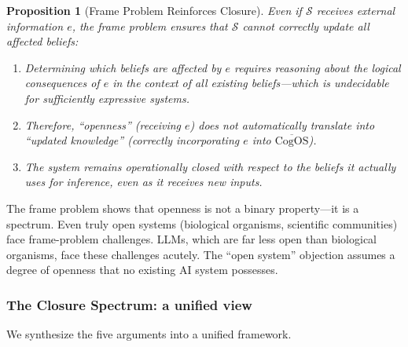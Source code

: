 \documentclass[11pt]{article}
\newtheorem{proposition}{Proposition}
\newcommand{\CogOS}{\text{CogOS}}
\begin{document}
\begin{proposition}[Frame Problem Reinforces Closure]
\label{prop:frame}
Even if $\mathcal{S}$ receives external information $e$, the frame problem
ensures that $\mathcal{S}$ cannot correctly update \textit{all} affected
beliefs:
\begin{enumerate}
\item[(a)] Determining which beliefs are affected by $e$ requires reasoning
      about the logical consequences of $e$ in the context of all existing
      beliefs---which is undecidable for sufficiently expressive systems.
\item[(b)] Therefore, ``openness'' (receiving $e$) does not automatically
      translate into ``updated knowledge'' (correctly incorporating $e$ into
      $\overline{\CogOS}$).
\item[(c)] The system remains operationally closed with respect to the beliefs
      it \textit{actually uses} for inference, even as it receives new inputs.
\end{enumerate}
\end{proposition}

\noindent The frame problem shows that openness is not a binary
property---it is a spectrum. Even truly open systems (biological organisms,
scientific communities) face frame-problem challenges. LLMs, which are far
less open than biological organisms, face these challenges acutely. The
``open system'' objection assumes a degree of openness that no existing AI
system possesses.

\subsubsection{The Closure Spectrum: a unified view}

We synthesize the five arguments into a unified framework.
\end{document}
